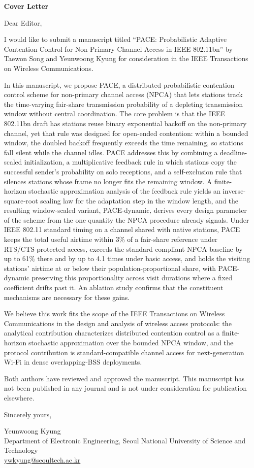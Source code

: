 \documentclass[11pt]{article}
\begin{document}
{\Large\bfseries Cover Letter}

\vspace{1em}

Dear Editor,

I would like to submit a manuscript titled ``PACE: Probabilistic Adaptive
Contention Control for Non-Primary Channel Access in IEEE 802.11bn'' by
Taewon Song and Yeunwoong Kyung for consideration in the IEEE Transactions
on Wireless Communications.

In this manuscript, we propose PACE, a distributed probabilistic contention
control scheme for non-primary channel access (NPCA) that lets stations
track the time-varying fair-share transmission probability of a depleting
transmission window without central coordination. The core problem is that
the IEEE 802.11bn draft has stations reuse binary exponential backoff on
the non-primary channel, yet that rule was designed for open-ended
contention: within a bounded window, the doubled backoff frequently
exceeds the time remaining, so stations fall silent while the channel
idles. PACE addresses this by combining a deadline-scaled initialization,
a multiplicative feedback rule in which stations copy the successful
sender's probability on solo receptions, and a self-exclusion rule that
silences stations whose frame no longer fits the remaining window. A
finite-horizon stochastic approximation analysis of the feedback rule
yields an inverse-square-root scaling law for the adaptation step in the
window length, and the resulting window-scaled variant, PACE-dynamic,
derives every design parameter of the scheme from the one quantity the
NPCA procedure already signals. Under IEEE 802.11 standard timing on a
channel shared with native stations, PACE keeps the total useful airtime
within 3\% of a fair-share reference under RTS/CTS-protected access,
exceeds the standard-compliant NPCA baseline by up to 61\% there and by up
to 4.1 times under basic access, and holds the visiting stations' airtime
at or below their population-proportional share, with PACE-dynamic
preserving this proportionality across visit durations where a fixed
coefficient drifts past it. An ablation study confirms that the
constituent mechanisms are necessary for these gains.

We believe this work fits the scope of the IEEE Transactions on Wireless
Communications in the design and analysis of wireless access protocols:
the analytical contribution characterizes distributed contention control
as a finite-horizon stochastic approximation over the bounded NPCA window,
and the protocol contribution is standard-compatible channel access for
next-generation Wi-Fi in dense overlapping-BSS deployments.

Both authors have reviewed and approved the manuscript. This manuscript
has not been published in any journal and is not under consideration for
publication elsewhere.

Sincerely yours,

Yeunwoong Kyung\\
Department of Electronic Engineering, Seoul National University of Science
and Technology\\
\href{mailto:ywkyung@seoultech.ac.kr}{ywkyung@seoultech.ac.kr}
\end{document}
